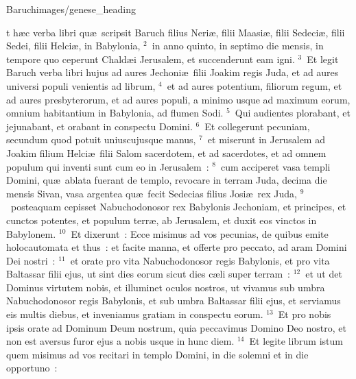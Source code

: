 {Baruch}{images/genese_heading}


\bchapter
{}t h\ae c verba libri qu\ae\ scripsit Baruch filius Neri\ae , filii Maasi\ae , filii Sedeci\ae , filii Sedei, filii Helci\ae , in Babylonia,
${}^{2}$~in anno quinto, in septimo die mensis, in tempore quo ceperunt Chald\ae i Jerusalem, et succenderunt eam igni.
${}^{3}$~Et legit Baruch verba libri hujus ad aures Jechoni\ae\ filii Joakim regis Juda, et ad aures universi populi venientis ad librum,
${}^{4}$~et ad aures potentium, filiorum regum, et ad aures presbyterorum, et ad aures populi, a minimo usque ad maximum eorum, omnium habitantium in Babylonia, ad flumen Sodi.
${}^{5}$~Qui audientes plorabant, et jejunabant, et orabant in conspectu Domini.
${}^{6}$~Et collegerunt pecuniam, secundum quod potuit uniuscujusque manus,
${}^{7}$~et miserunt in Jerusalem ad Joakim filium Helci\ae\ filii Salom sacerdotem, et ad sacerdotes, et ad omnem populum qui inventi sunt cum eo in Jerusalem~:
${}^{8}$~cum acciperet vasa templi Domini, qu\ae\ ablata fuerant de templo, revocare in terram Juda, decima die mensis Sivan, vasa argentea qu\ae\ fecit Sedecias filius Josi\ae\ rex Juda,
${}^{9}$~posteaquam cepisset Nabuchodonosor rex Babylonis Jechoniam, et principes, et cunctos potentes, et populum terr\ae , ab Jerusalem, et duxit eos vinctos in Babylonem.
${}^{10}$~Et dixerunt~: Ecce misimus ad vos pecunias, de quibus emite holocautomata et thus~: et facite manna, et offerte pro peccato, ad aram Domini Dei nostri~:
${}^{11}$~et orate pro vita Nabuchodonosor regis Babylonis, et pro vita Baltassar filii ejus, ut sint dies eorum sicut dies c\ae li super terram~:
${}^{12}$~et ut det Dominus virtutem nobis, et illuminet oculos nostros, ut vivamus sub umbra Nabuchodonosor regis Babylonis, et sub umbra Baltassar filii ejus, et serviamus eis multis diebus, et inveniamus gratiam in conspectu eorum.
${}^{13}$~Et pro nobis ipsis orate ad Dominum Deum nostrum, quia peccavimus Domino Deo nostro, et non est aversus furor ejus a nobis usque in hunc diem.
${}^{14}$~Et legite librum istum quem misimus ad vos recitari in templo Domini, in die solemni et in die opportuno~:
